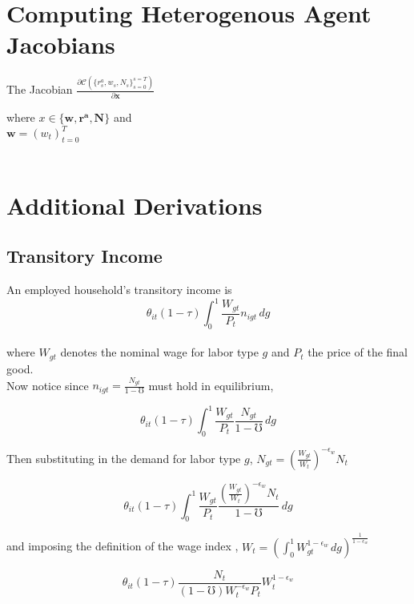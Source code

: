 \documentclass[titlepage]{\econtex}\providecommand{\texname}{FBS-NK}
\begin{document}
 
 \hypertarget{Computing Heterogenous Agent Jacobians}{}
\section{Computing Heterogenous Agent Jacobians} 

The Jacobian $\frac{ \partial \mathcal{C}(\{r_{s}^{a} ,w_{s}, N_{s}\}_{s=0}^{s=T})}{\partial \mathbf{x}} $

where $ x \in \{\mathbf{w} ,\mathbf{r^{a}} , \mathbf{N}\} $ and \\ 

$\mathbf{w} = (w_{t})_{t=0}^{T}$ \\ \\
  
\hypertarget{Additional Derivations}{}
\section{Additional Derivations} 

\hypertarget{Transitory Income}{}
\subsection{Transitory Income} 

An employed household's transitory income is \\

$$ \theta_{it}(1-\tau) \int_{0}^{1} \frac{W_{gt}}{P_{t}}n_{igt}\,dg$$\\

where $W_{gt}$ denotes the nominal wage for labor type $g$ and $P_{t}$ the price of the final good. \\ 

Now notice since $n_{igt} = \frac{N_{gt}}{1-\mho}$ must hold in equilibrium,

$$ \theta_{it}(1-\tau) \int_{0}^{1} \frac{W_{gt}}{P_{t}}\frac{N_{gt}}{1-\mho}\,dg$$

Then substituting in the demand for labor type $g$, $ N_{gt} = \left(\frac{W_{gt}}{W_{t}}\right)^{-\epsilon_{w}} N_{t} $

$$ \theta_{it}(1-\tau) \int_{0}^{1} \frac{W_{gt}}{P_{t}}\frac{\left(\frac{W_{gt}}{W_{t}}\right)^{-\epsilon_{w}} N_{t}}{1-\mho}\,dg$$

and imposing the definition of the wage index , $W_{t} = \left(\int_{0}^{1} W_{gt}^{1-\epsilon_{w}}\,dg\right)^{\frac{1}{1-\epsilon_{w}}}$

$$\theta_{it}(1-\tau) \frac{N_{t}}{(1-\mho) W_{t}^{-\epsilon_{w}}P_{t}} W_{t}^{1-\epsilon_{w}} $$
\end{document}
